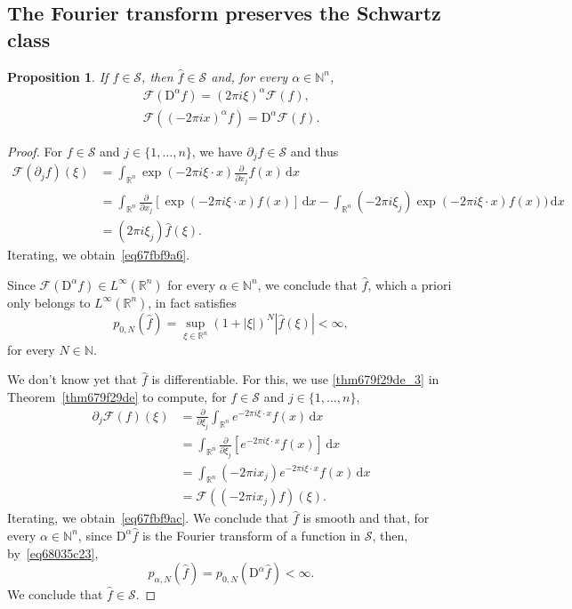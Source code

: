 \documentclass[a4paper,9pt]{amsart}
\newcommand{\scr}[1]{\mathscr{#1}}
\newcommand{\N}{\mathbb{N}}	%
\newcommand{\R}{\mathbb{R}}	%
\newcommand{\did}{\,\mathrm{d}}	%
\newcommand{\de}{\partial}		%
\newcommand{\Diff}{\mathrm{D}}
\theoremstyle{plain}
\newtheorem{proposition}{Proposition}[section]
\theoremstyle{definition}
\theoremstyle{remark}
\begin{document}
\subsection{The Fourier transform preserves the Schwartz class}
\begin{proposition}
	If $f \in\scr S$, then $\hat f\in\scr S$ and, for every $\alpha\in\N^n$,
	\begin{gather}
	\label{eq67fbf9a6}
		\scr F(\Diff^\alpha f) = (2\pi i\xi)^\alpha \scr F(f) ,\\
	\label{eq67fbf9ac}
		\scr F( (-2\pi ix)^\alpha f) = \Diff^\alpha\scr F(f) .
	\end{gather}
\end{proposition}
\begin{proof}
	For $f \in\scr S$ and $j\in\{1,\dots,n\}$, we have $\de_jf\in\scr S$ and thus
	\begin{align*}
	 	\scr F(\de_jf)(\xi)
		&= \int_{\R^n} \exp(-2\pi i\xi\cdot x) \frac{\de}{\de x_j} f(x) \did x \\
		&= \int_{\R^n} \frac{\de}{\de x_j} [\exp(-2\pi i\xi\cdot x) f(x)] \did x 
			- \int_{\R^n} (-2\pi i\xi_j) \exp(-2\pi i\xi\cdot x) f(x)) \did x \\
		&= (2\pi i\xi_j) \hat f(\xi) .
	\end{align*}
	Iterating, we obtain~\eqref{eq67fbf9a6}.
	
	Since $\scr F(\Diff^\alpha f)\in L^\infty(\R^n)$ for every $\alpha\in\N^n$,
	we conclude that $\hat f$, which a priori only belongs to $L^\infty(\R^n)$, in fact satisfies
	\begin{equation}\label{eq68035c23}
		p_{0,N}(\hat f) = \sup_{\xi\in\R^n} (1+|\xi|)^N |\hat f(\xi)| < \infty ,
	\end{equation}
	for every $N\in\N$.
	
	We don't know yet that $\hat f$ is differentiable.
	For this, we use \ref{thm679f29de_3} in Theorem~\ref{thm679f29de} to compute, for $f\in\scr S$ and $j\in\{1,\dots,n\}$,
	\begin{align}
		\de_j\scr F(f)(\xi)
		&= \frac{\de}{\de \xi_j} \int_{\R^n} e^{-2\pi i \xi\cdot x} f(x) \did x \\
		&= \int_{\R^n} \frac{\de}{\de \xi_j} [ e^{-2\pi i \xi\cdot x} f(x) ] \did x \\
		&= \int_{\R^n} (-2\pi ix_j) e^{-2\pi i \xi\cdot x} f(x) \did x \\
		&= \scr F((-2\pi ix_j) f)(\xi) .
	\end{align}
	Iterating, we obtain~\eqref{eq67fbf9ac}.
	We conclude that $\hat f$ is smooth and that, for every $\alpha\in\N^n$, since $\Diff^\alpha\hat f$ is the Fourier transform of a function in $\scr S$, then, by~\eqref{eq68035c23},
	\begin{equation}
		p_{\alpha,N}(\hat f) 
		= p_{0,N}(\Diff^\alpha\hat f) < \infty .
	\end{equation}
	We conclude that $\hat f\in\scr S$.
\end{proof}
\end{document}
